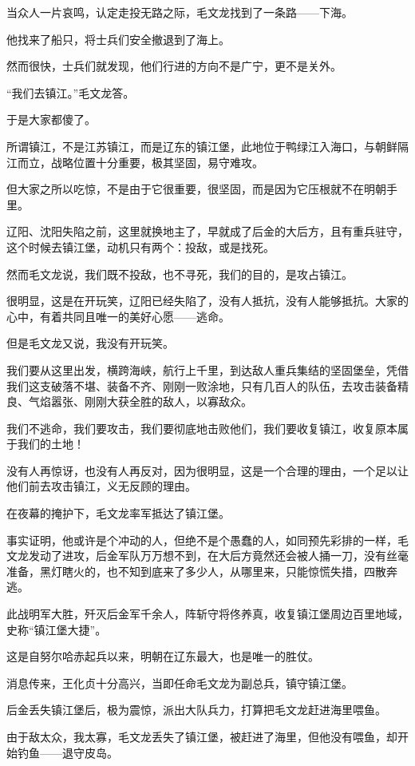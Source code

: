 \begin{multicols}{\theparacolNo}
		当众人一片哀鸣，认定走投无路之际，毛文龙找到了一条路——下海。

		他找来了船只，将士兵们安全撤退到了海上。

		然而很快，士兵们就发现，他们行进的方向不是广宁，更不是关外。

		“我们去镇江。”毛文龙答。

		于是大家都傻了。

		所谓镇江，不是江苏镇江，而是辽东的镇江堡，此地位于鸭绿江入海口，与朝鲜隔江而立，战略位置十分重要，极其坚固，易守难攻。

		但大家之所以吃惊，不是由于它很重要，很坚固，而是因为它压根就不在明朝手里。

		辽阳、沈阳失陷之前，这里就换地主了，早就成了后金的大后方，且有重兵驻守，这个时候去镇江堡，动机只有两个：投敌，或是找死。

		然而毛文龙说，我们既不投敌，也不寻死，我们的目的，是攻占镇江。

		很明显，这是在开玩笑，辽阳已经失陷了，没有人抵抗，没有人能够抵抗。大家的心中，有着共同且唯一的美好心愿——逃命。

		但是毛文龙又说，我没有开玩笑。

		我们要从这里出发，横跨海峡，航行上千里，到达敌人重兵集结的坚固堡垒，凭借我们这支破落不堪、装备不齐、刚刚一败涂地，只有几百人的队伍，去攻击装备精良、气焰嚣张、刚刚大获全胜的敌人，以寡敌众。

		我们不逃命，我们要攻击，我们要彻底地击败他们，我们要收复镇江，收复原本属于我们的土地！

		没有人再惊讶，也没有人再反对，因为很明显，这是一个合理的理由，一个足以让他们前去攻击镇江，义无反顾的理由。

		在夜幕的掩护下，毛文龙率军抵达了镇江堡。

		事实证明，他或许是个冲动的人，但绝不是个愚蠢的人，如同预先彩排的一样，毛文龙发动了进攻，后金军队万万想不到，在大后方竟然还会被人捅一刀，没有丝毫准备，黑灯瞎火的，也不知到底来了多少人，从哪里来，只能惊慌失措，四散奔逃。

		此战明军大胜，歼灭后金军千余人，阵斩守将佟养真，收复镇江堡周边百里地域，史称“镇江堡大捷”。

		这是自努尔哈赤起兵以来，明朝在辽东最大，也是唯一的胜仗。

		消息传来，王化贞十分高兴，当即任命毛文龙为副总兵，镇守镇江堡。

		后金丢失镇江堡后，极为震惊，派出大队兵力，打算把毛文龙赶进海里喂鱼。

		由于敌太众，我太寡，毛文龙丢失了镇江堡，被赶进了海里，但他没有喂鱼，却开始钓鱼——退守皮岛。


\end{multicols}

